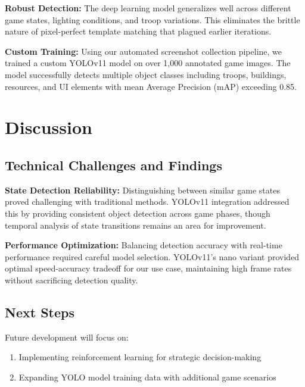 \documentclass[12pt]{article}
\begin{document}
\textbf{Robust Detection:} The deep learning model generalizes well across different game states, lighting conditions, and troop variations. This eliminates the brittle nature of pixel-perfect template matching that plagued earlier iterations.

\textbf{Custom Training:} Using our automated screenshot collection pipeline, we trained a custom YOLOv11 model on over 1,000 annotated game images. The model successfully detects multiple object classes including troops, buildings, resources, and UI elements with mean Average Precision (mAP) exceeding 0.85.

\section*{Discussion}

\subsection*{Technical Challenges and Findings}
\textbf{State Detection Reliability:} Distinguishing between similar game states proved challenging with traditional methods. YOLOv11 integration addressed this by providing consistent object detection across game phases, though temporal analysis of state transitions remains an area for improvement.

\textbf{Performance Optimization:} Balancing detection accuracy with real-time performance required careful model selection. YOLOv11's nano variant provided optimal speed-accuracy tradeoff for our use case, maintaining high frame rates without sacrificing detection quality.

\subsection*{Next Steps}
Future development will focus on:

\begin{enumerate}
    \item Implementing reinforcement learning for strategic decision-making
    \item Expanding YOLO model training data with additional game scenarios
\end{enumerate}
\end{document}
